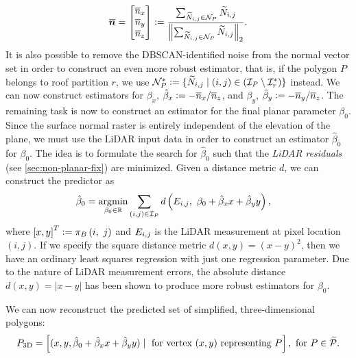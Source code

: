 \begin{equation*}
  \overline{\boldsymbol{n}}
  =
  \begin{bmatrix}
    \overline{n}_x\\
    \overline{n}_y\\
    \overline{n}_z
  \end{bmatrix}
  \vcentcolon=
  \frac{
    \sum_{\widetilde{N}_{i,j} \in \mathcal{N}_P} \widetilde{N}_{i,j}
  }{
    \left\lVert\sum_{\widetilde{N}_{i,j} \in \mathcal{N}_P} \widetilde{N}_{i,j}\right\rVert_2
  }.
\end{equation*}
It is also possible to remove the DBSCAN-identified noise from the normal vector set in order to construct an even more robust estimator, that is, if the polygon $P$ belongs to roof partition $r$, we use $\mathcal{N}_{P}^* \vcentcolon= \{\widetilde{N}_{i,j} \mid (i,j) \in (\mathcal{I}_P \setminus \mathcal{I}_r^*) \}$ instead.
We can now construct estimators for $\beta_x$, $\hat{\beta}_x \vcentcolon= -\overline{n}_x / \overline{n}_z$, and $\beta_y$, $\hat{\beta}_y \vcentcolon= -\overline{n}_y / \overline{n}_z$.
The remaining task is now to construct an estimator for the final planar parameter $\beta_0$.
Since the surface normal raster is entirely independent of the elevation of the plane, we must use the LiDAR input data in order to construct an estimator $\hat{\beta}_0$ for $\beta_0$.
The idea is to formulate the search for $\hat{\beta}_0$ such that the \textit{LiDAR residuals} (see \cref{sec:non-planar-fix}) are minimized.
Given a distance metric $d$, we can construct the predictor as
\begin{align*}
  \hat{\beta}_0
  &=
  \operatorname*{\arg\!\min}_{\beta_0 \in \mathbb{R}}
  \sum_{(i,j) \in \mathcal{I}_P}
  d\left(
    E_{i,j},~
    \beta_0 + \hat{\beta}_x x + \hat{\beta}_y y
  \right),
\end{align*}
where ${[x, y]}^T \vcentcolon= \pi_{B}\left(i,~j\right)$ and $E_{i,j}$ is the LiDAR measurement at pixel location $(i,j)$.
If we specify the square distance metric $d(x, y) = (x - y)^2$, then we have an ordinary least squares regression with just one regression parameter.
Due to the nature of LiDAR measurement errors, the absolute distance $d(x, y) = |x - y|$ has been shown to produce more robust estimators for $\beta_0$.

We can now reconstruct the predicted set of simplified, three-dimensional polygons:
\begin{equation*}
  P_{\mathrm{3D}}
  =
  \left[
    (x, y, \hat{\beta}_0 + \hat{\beta}_x x + \hat{\beta}_y y)
    \mid
    \text{ for vertex } (x, y) \text{ representing } P
  \right],
  \text{ for } P \in \widetilde{\mathcal{P}}.
\end{equation*}
